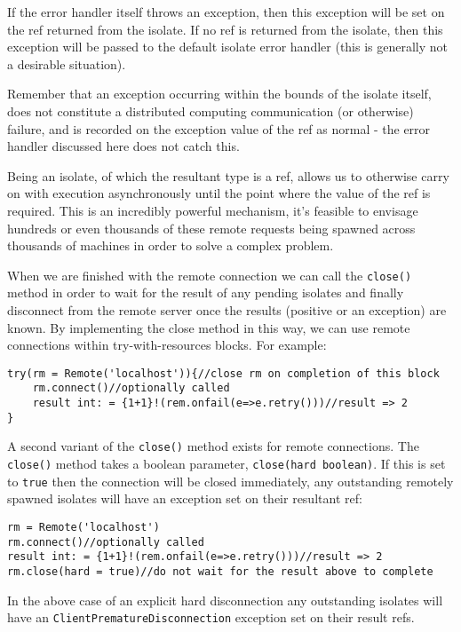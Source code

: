 \documentclass[conc-doc]{subfiles}
\begin{document}
If the error handler itself throws an exception, then this exception will be set on the ref returned from the isolate. If no ref is returned from the isolate, then this exception will be passed to the default isolate error handler (this is generally not a desirable situation).

Remember that an exception occurring within the bounds of the isolate itself, does not constitute a distributed computing communication (or otherwise) failure, and is recorded on the exception value of the ref as normal - the error handler discussed here does not catch this.

Being an isolate, of which the resultant type is a ref, allows us to otherwise carry on with execution asynchronously until the point where the value of the ref is required. This is an incredibly powerful mechanism, it’s feasible to envisage hundreds or even thousands of these remote requests being spawned across thousands of machines in order to solve a complex problem.

When we are finished with the remote connection we can call the \lstinline{close()} method in order to wait for the result of any pending isolates and finally disconnect from the remote server once the results (positive or an exception) are known. By implementing the close method in this way, we can use remote connections within try-with-resources blocks. For example:

\begin{lstlisting}
try(rm = Remote('localhost')){//close rm on completion of this block
	rm.connect()//optionally called
	result int: = {1+1}!(rem.onfail(e=>e.retry()))//result => 2
}
\end{lstlisting}

A second variant of the \lstinline{close()} method exists for remote connections. The \lstinline{close()} method takes a boolean parameter, \lstinline{close(hard boolean)}. If this is set to \lstinline{true} then the connection will be closed immediately, any outstanding remotely spawned isolates will have an exception set on their resultant ref:

\begin{lstlisting}
rm = Remote('localhost')
rm.connect()//optionally called
result int: = {1+1}!(rem.onfail(e=>e.retry()))//result => 2
rm.close(hard = true)//do not wait for the result above to complete
\end{lstlisting}

In the above case of an explicit hard disconnection any outstanding isolates will have an \lstinline{ClientPrematureDisconnection} exception set on their result refs.
\end{document}
